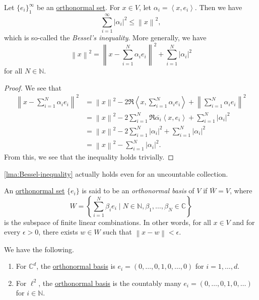 \begin{lemma}\label{lma:Bessel-inequality}
	Let \(\{e_i\}_1^\infty\) be an \hyperref[def:orthonormal-set]{orthonormal set}. For \(x \in V\), let \(\alpha_i = \left< x,e_i \right>\). Then we have
	\[
		\sum\limits_{i=1}^\infty \left\vert \alpha_i \right\vert^2 \leq \left\lVert x\right\rVert^2,
	\]
	which is so-called the \emph{Bessel's inequality}. More generally, we have
	\[
		\left\lVert x\right\rVert^2 = \left\lVert x - \sum\limits_{i=1}^N \alpha_i e_i\right\rVert ^2 + \sum\limits_{i=1}^N \left\vert \alpha_i \right\vert ^2
	\]
	for all \(N \in \mathbb{N}\).
\end{lemma}
\begin{proof}
	We see that
	\[
		\begin{split}
			\left\lVert x - \sum_{i=1}^N \alpha_ie_i\right\rVert^2
			&= \left\lVert x\right\rVert^2 - 2\Re \left< x, \sum_{i=1}^N \alpha_i e_i\right> + \left\lVert \sum_{i=1}^N \alpha_i e_i\right\rVert ^2 \\
			&= \left\lVert x\right\rVert^2 - 2\sum_{i=1}^N \Re \overline{\alpha_i}\left< x,e_i \right> + \sum_{i=1}^N \left\vert \alpha_i \right\vert ^2 \\
			&= \left\lVert x\right\rVert^2 - 2\sum_{i=1}^N \left\vert \alpha_i \right\vert ^2 + \sum_{i=1}^N \left\vert \alpha_i \right\vert ^2 \\
			&= \left\lVert x\right\rVert^2 - \sum_{i=1}^N \left\vert \alpha_i \right\vert ^2.
		\end{split}
	\]
	From this, we see that the inequality holds trivially.
\end{proof}
\begin{remark}
	\autoref{lma:Bessel-inequality} actually holds even for an uncountable collection.
\end{remark}

\begin{definition}\label{def:orthonormal-basis}
	An \hyperref[def:orthonormal-set]{orthonormal set} \(\{e_i\}\) is said to be an \emph{orthonormal basis} of \(V\) if \(\overline{W} = V\), where
	\[
		W = \left\{\sum_{i=1}^N \beta_i e_i \mid N \in \mathbb{N}, \beta_1,\ldots,\beta_N \in \mathbb{C}\right\}
	\]
	is the subspace of finite linear combinations. In other words, for all \(x \in V\) and for every \(\epsilon > 0\), there exists \(w \in W\) such that \(\left\lVert x - w\right\rVert  < \epsilon \).
\end{definition}

\begin{eg}
	We have the following.
	\begin{enumerate}[(1)]
		\item For \(\mathbb{C}^d\), the \hyperref[def:orthonormal-basis]{orthonormal basis} is \(e_i = (0,\ldots,0,1,0,\ldots,0)\) for \(i = 1,\ldots,d\).
		\item For \(\ell^2\), the \hyperref[def:orthonormal-basis]{orthonormal basis} is the countably many \(e_i = (0,\ldots,0,1,0,\ldots)\) for \(i \in \mathbb{N}\).
	\end{enumerate}
\end{eg}

